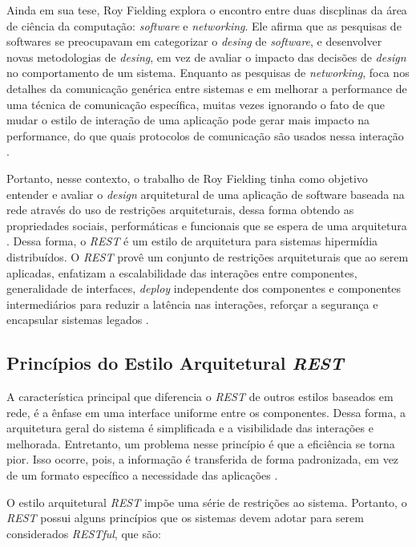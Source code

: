 	Ainda em sua tese, Roy Fielding explora o encontro entre duas discplinas da área de ciência da computação: \textit{software} e \textit{networking}. Ele afirma que as pesquisas de softwares se preocupavam em categorizar o \textit{desing} de \textit{software}, e desenvolver novas metodologias de \textit{desing}, em vez de avaliar o impacto das decisões de \textit{design} no comportamento de um sistema. Enquanto as pesquisas de \textit{networking}, foca nos detalhes da comunicação genérica entre sistemas e em melhorar a performance de uma técnica de comunicação específica, muitas vezes ignorando o fato de que mudar o estilo de interação de uma aplicação pode gerar mais impacto na performance, do que quais protocolos de comunicação são usados nessa interação \cite{fielding2000architectural}.
	
	Portanto, nesse contexto, o trabalho de Roy Fielding tinha como objetivo entender e avaliar o \textit{design} arquitetural de uma aplicação de software baseada na rede através do uso de restrições arquiteturais, dessa forma obtendo as propriedades sociais, performáticas e funcionais que se espera de uma arquitetura \cite{fielding2000architectural}. Dessa forma, o \textit{REST} é um estilo de arquitetura para sistemas hipermídia distribuídos. O \textit{REST} provê um conjunto de restrições arquiteturais que ao serem aplicadas, enfatizam a escalabilidade das interações entre componentes, generalidade de interfaces, \textit{deploy} independente dos componentes e componentes intermediários para reduzir a latência nas interações, reforçar a segurança e encapsular sistemas legados \cite{fielding2000architectural}.
	
\subsection{Princípios do Estilo Arquitetural \textit{REST}}

	A característica principal que diferencia o \textit{REST} de outros estilos baseados em rede, é a ênfase em uma interface uniforme entre os componentes. Dessa forma, a arquitetura geral do sistema é simplificada e a visibilidade das interações e melhorada. Entretanto, um problema nesse princípio é que a eficiência se torna pior. Isso ocorre, pois, a informação é transferida de forma padronizada, em vez de um formato específico a necessidade das aplicações \cite{fielding2000architectural}.
	
	O estilo arquitetural \textit{REST} impõe uma série de restrições ao sistema. Portanto, o \textit{REST} possui alguns princípios que os sistemas devem adotar para serem considerados \textit{RESTful}, que são: 


